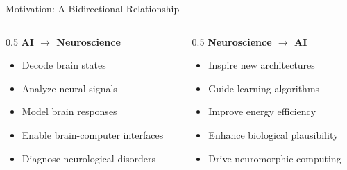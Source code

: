 \documentclass[aspectratio=169]{beamer}
\begin{document}
\begin{frame}{Motivation: A Bidirectional Relationship}
  \begin{columns}[T]
    \begin{column}{0.5\textwidth}
      \textbf{AI $\rightarrow$ Neuroscience}
      \begin{itemize}
        \item Decode brain states
        \item Analyze neural signals
        \item Model brain responses
        \item Enable brain-computer interfaces
        \item Diagnose neurological disorders
      \end{itemize}
    \end{column}
    
    \begin{column}{0.5\textwidth}
      \textbf{Neuroscience $\rightarrow$ AI}
      \begin{itemize}
        \item Inspire new architectures
        \item Guide learning algorithms
        \item Improve energy efficiency
        \item Enhance biological plausibility
        \item Drive neuromorphic computing
      \end{itemize}
    \end{column}
  \end{columns}
  
  \vspace{1em}
  \begin{center}
  \end{center}
  
  \tiny \cite{onciulArtificialIntelligenceNeuroscience2025,hassabisNeuroscienceinspiredArtificialIntelligence2017}
\end{frame}
\end{document}
